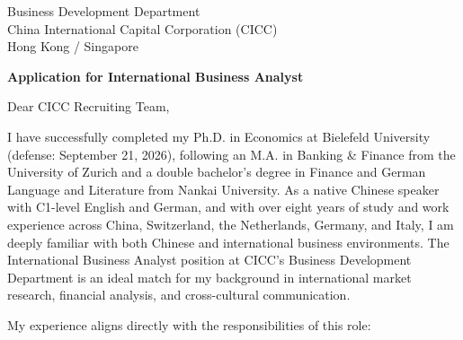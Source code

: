 \documentclass[11pt]{article}
\begin{document}
\vspace{0.1cm}

\vspace{0.1cm}

\noindent
Business Development Department \\
China International Capital Corporation (CICC) \\
Hong Kong / Singapore

\vspace{0.12cm}

\noindent
\textbf{Application for International Business Analyst}

\vspace{0.1cm}

\noindent Dear CICC Recruiting Team,

I have successfully completed my Ph.D. in Economics at Bielefeld University (defense: September 21, 2026), following an M.A. in Banking \& Finance from the University of Zurich and a double bachelor's degree in Finance and German Language and Literature from Nankai University. As a native Chinese speaker with C1-level English and German, and with over eight years of study and work experience across China, Switzerland, the Netherlands, Germany, and Italy, I am deeply familiar with both Chinese and international business environments. The International Business Analyst position at CICC's Business Development Department is an ideal match for my background in international market research, financial analysis, and cross-cultural communication.

My experience aligns directly with the responsibilities of this role:
\end{document}
